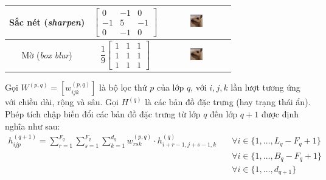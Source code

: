 \begin{table}[htb!]
\begin{tabular}{ c c c }
        Sắc nét (\textit{sharpen})   & $\begin{bmatrix}0&-1&0\\-1&5&-1\\0&-1&0\end{bmatrix}$         & \includegraphics[width=0.2\textwidth, valign=c]{image/cnn-sharp.png} \\\midrule
        Mờ (\textit{box blur})       & $\dfrac{1}{9}\begin{bmatrix}1&1&1\\1&1&1\\1&1&1\end{bmatrix}$ & \includegraphics[width=0.2\textwidth, valign=c]{image/cnn-blur.png}  \\
        \bottomrule
    \end{tabular}
\end{table}

Gọi $W^{(p,q)}=[w_{ijk}^{(p,q)}]$ là bộ lọc thứ $p$ của lớp $q$, với $i,j,k$ lần lượt tương ứng với chiều dài, rộng và sâu. Gọi $H^{(q)}$ là các bản đồ đặc trưng (hay trạng thái ẩn). Phép tích chập biến đổi các bản đồ đặc trưng từ lớp $q$ đến lớp $q+1$ được định nghĩa như sau: \cite{Aggarwal2023}
\begin{align}
    h_{ijp}^{(q+1)}=\sum_{r=1}^{F_q}\sum_{s=1}^{F_q}\sum_{k=1}^{d_q} w_{rsk}^{(p,q)}\cdot h_{i+r-1,j+s-1,k}^{(q)} & \quad\forall i\in\{1,\dots,L_q-F_q+1\}           \\
                                                                                                                  & \quad\forall i\in\{1,\dots,B_q-F_q+1\} \nonumber \\
                                                                                                                  & \quad\forall i\in\{1,\dots,d_{q+1}\}   \nonumber
\end{align}


